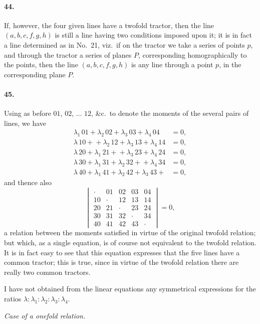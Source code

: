 \documentclass[11pt,a4paper]{article}
\begin{document}
\paragraph{44.}
If, however, the four given lines have a twofold tractor, then the line
$(a,b,c,f,g,h)$ is still a line having two conditions imposed upon it; it is in fact a
line determined as in No.\ 21, viz.\ if on the tractor we take a series of points $p$, and
through the tractor a series of planes $P$, corresponding homographically to the points,
then the line $(a,b,c,f,g,h)$ is any line through a point $p$, in the corresponding
plane $P$.

\paragraph{45.}
Using as before $01$, $02$, $\ldots$ $12$, \&c.\ to denote the moments of the several
pairs of lines, we have
\begin{align*}
\lambda_1\,01 + \lambda_2\,02 + \lambda_3\,03 + \lambda_4\,04 &= 0, \\
\lambda\,10 + {} + \lambda_2\,12 + \lambda_3\,13 + \lambda_4\,14 &= 0, \\
\lambda\,20 + \lambda_1\,21 + {} + \lambda_3\,23 + \lambda_4\,24 &= 0, \\
\lambda\,30 + \lambda_1\,31 + \lambda_2\,32 + {} + \lambda_4\,34 &= 0, \\
\lambda\,40 + \lambda_1\,41 + \lambda_2\,42 + \lambda_3\,43 + {} &= 0,
\end{align*}
and thence also
\[
\begin{vmatrix}
\cdot & 01 & 02 & 03 & 04 \\
10 & \cdot & 12 & 13 & 14 \\
20 & 21 & \cdot & 23 & 24 \\
30 & 31 & 32 & \cdot & 34 \\
40 & 41 & 42 & 43 & \cdot
\end{vmatrix} = 0,
\]
a relation between the moments satisfied in virtue of the original twofold relation; but
which, as a single equation, is of course not equivalent to the twofold relation. It is
in fact easy to see that this equation expresses that the five lines have a common
tractor; this is true, since in virtue of the twofold relation there are really two
common tractors.

I have not obtained from the linear equations any symmetrical expressions for the
ratios $\lambda : \lambda_1 : \lambda_2 : \lambda_3 : \lambda_4$.

\bigskip
\begin{center}
\textit{Case of a onefold relation.}
\end{center}
\end{document}
